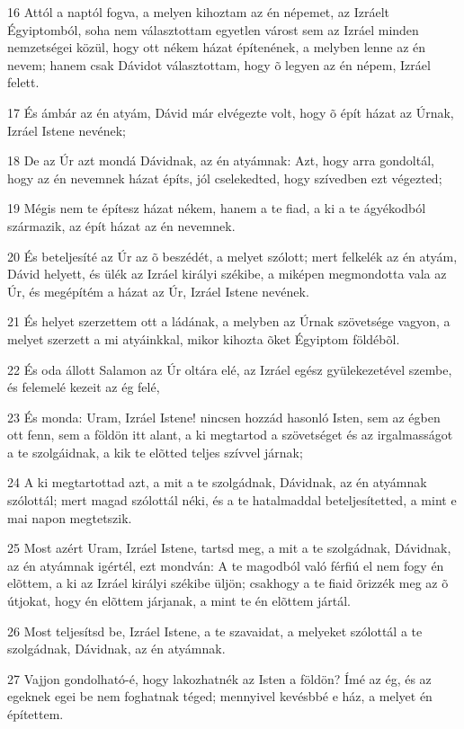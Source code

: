 \par 16 Attól a naptól fogva, a melyen kihoztam az én népemet, az Izráelt Égyiptomból, soha nem választottam egyetlen várost sem az Izráel minden nemzetségei közül, hogy ott nékem házat építenének, a melyben lenne az én nevem; hanem csak Dávidot választottam, hogy õ legyen az én népem, Izráel felett.
\par 17 És ámbár az én atyám, Dávid már elvégezte volt, hogy õ épít házat az Úrnak, Izráel Istene nevének;
\par 18 De az Úr azt mondá Dávidnak, az én atyámnak: Azt, hogy arra gondoltál, hogy az én nevemnek házat építs, jól cselekedted, hogy szívedben ezt végezted;
\par 19 Mégis nem te építesz házat nékem, hanem a te fiad, a ki a te ágyékodból származik, az épít házat az én nevemnek.
\par 20 És beteljesíté az Úr az õ beszédét, a melyet szólott; mert felkelék az én atyám, Dávid helyett, és ülék az Izráel királyi székibe, a miképen megmondotta vala az Úr, és megépítém a házat az Úr, Izráel Istene nevének.
\par 21 És helyet szerzettem ott a ládának, a melyben az Úrnak szövetsége vagyon, a melyet szerzett a mi atyáinkkal, mikor kihozta õket Égyiptom földébõl.
\par 22 És oda állott Salamon az Úr oltára elé, az Izráel egész gyülekezetével szembe, és felemelé kezeit az ég felé,
\par 23 És monda: Uram, Izráel Istene! nincsen hozzád hasonló Isten, sem az égben ott fenn, sem a földön itt alant, a ki megtartod a szövetséget és az irgalmasságot a te szolgáidnak, a kik te elõtted teljes szívvel járnak;
\par 24 A ki megtartottad azt, a mit a te szolgádnak, Dávidnak, az én atyámnak szólottál; mert magad szólottál néki, és a te hatalmaddal beteljesítetted, a mint e mai napon megtetszik.
\par 25 Most azért Uram, Izráel Istene, tartsd meg, a mit a te szolgádnak, Dávidnak, az én atyámnak igértél, ezt mondván: A te magodból való férfiú el nem fogy én elõttem, a ki az Izráel királyi székibe üljön; csakhogy a te fiaid õrizzék meg az õ útjokat, hogy én elõttem járjanak, a mint te én elõttem jártál.
\par 26 Most teljesítsd be, Izráel Istene, a te szavaidat, a melyeket szólottál a te szolgádnak, Dávidnak, az én atyámnak.
\par 27 Vajjon gondolható-é, hogy lakozhatnék az Isten a földön? Ímé az ég, és az egeknek egei be nem foghatnak téged; mennyivel kevésbbé e ház, a melyet én építettem.
